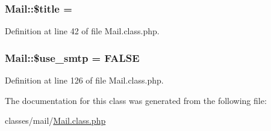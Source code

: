 \hypertarget{classMail_aea1a8697c961d49a688564c5ca16cbcb}{}
\subsubsection[{\$title}]{\setlength{\rightskip}{0pt plus 5cm}Mail\+::\$title = \textquotesingle{}\textquotesingle{}}\label{classMail_aea1a8697c961d49a688564c5ca16cbcb}


Definition at line 42 of file Mail.\+class.\+php.

\hypertarget{classMail_a8fe39b2063dc112d7db67be074142628}{}
\subsubsection[{\$use\+\_\+smtp}]{\setlength{\rightskip}{0pt plus 5cm}Mail\+::\$use\+\_\+smtp = F\+A\+L\+S\+E}\label{classMail_a8fe39b2063dc112d7db67be074142628}


Definition at line 126 of file Mail.\+class.\+php.



The documentation for this class was generated from the following file\+:\begin{DoxyCompactItemize}
\item 
classes/mail/\hyperlink{Mail_8class_8php}{Mail.\+class.\+php}\end{DoxyCompactItemize}
